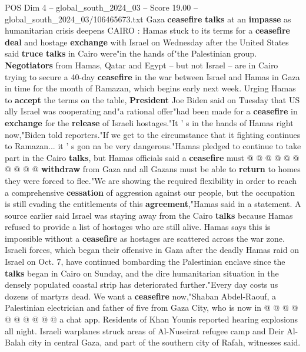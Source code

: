 \begin{textsample}{POS Dim 4 – global\_south\_2024\_03 – Score 19.00 – global\_south\_2024\_03/106465673.txt}  \label{ex:f4_pos_108}
Gaza \textbf{ceasefire} \textbf{talks} at an \textbf{impasse} as humanitarian crisis deepens CAIRO : Hamas stuck to its terms for a \textbf{ceasefire} \textbf{deal} and hostage \textbf{exchange} with Israel on Wednesday after the United States said \textbf{truce} \textbf{talks} in Cairo were"in the hands of"the Palestinian group. \textbf{Negotiators} from Hamas, Qatar and Egypt -- but not Israel -- are in Cairo trying to secure a 40-day \textbf{ceasefire} in the war between Israel and Hamas in Gaza in time for the month of Ramazan, which begins early next week.
Urging Hamas to \textbf{accept} the terms on the table, \textbf{President} Joe Biden said on Tuesday that US ally Israel was cooperating and"a rational offer"had been made for a \textbf{ceasefire} in \textbf{exchange} for the \textbf{release} of Israeli hostages."It ' s in the hands of Hamas right now,"Biden told reporters."If we get to the circumstance that it fighting continues to Ramazan... it ' s gon na be very dangerous."Hamas pledged to continue to take part in the Cairo \textbf{talks}, but Hamas officials said a \textbf{ceasefire} must @ @ @ @ @ @ @ @ @ @ \textbf{withdraw} from Gaza and all Gazans must be able to \textbf{return} to homes they were forced to flee."We are showing the required flexibility in order to reach a comprehensive \textbf{cessation} of aggression against our people, but the occupation is still evading the entitlements of this \textbf{agreement},"Hamas said in a statement.
A source earlier said Israel was staying away from the Cairo \textbf{talks} because Hamas refused to provide a list of hostages who are still alive.
Hamas says this is impossible without a \textbf{ceasefire} as hostages are scattered across the war zone.
Israeli forces, which began their offensive in Gaza after the deadly Hamas raid on Israel on Oct. 7, have continued bombarding the Palestinian enclave since the \textbf{talks} began in Cairo on Sunday, and the dire humanitarian situation in the densely populated coastal strip has deteriorated further."Every day costs us dozens of martyrs dead.
We want a \textbf{ceasefire} now,"Shaban Abdel-Raouf, a Palestinian electrician and father of five from Gaza City, who is now in @ @ @ @ @ @ @ @ @ @ a chat app.
Residents of Khan Younis reported hearing explosions all night.
Israeli warplanes struck areas of Al-Nuseirat refugee camp and Deir Al-Balah city in central Gaza, and part of the southern city of Rafah, witnesses said.

\end{textsample}
